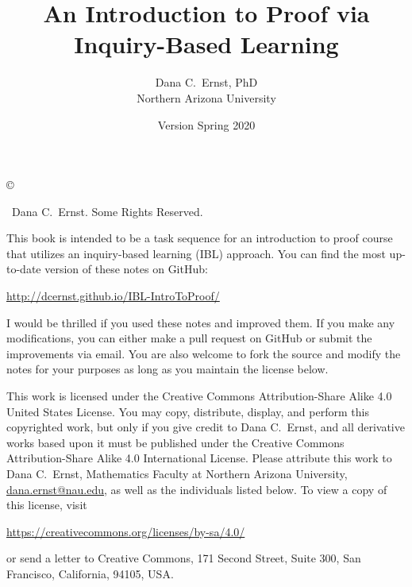 \documentclass[12pt,oneside]{book}
\theoremstyle{definition}
\begin{document}
\title{An Introduction to Proof via \\Inquiry-Based Learning}
\author{Dana C.~Ernst, PhD\\
Northern Arizona University}
\date{Version Spring 2020}

\maketitle
\thispagestyle{empty}

\noindent\copyright{ \the\year\ Dana C.~Ernst.  Some Rights Reserved.\\

\bigskip

\noindent This book is intended to be a task sequence for an introduction to proof course that utilizes an inquiry-based learning (IBL) approach.  You can find the most up-to-date version of these notes on GitHub:
\begin{center}
\url{http://dcernst.github.io/IBL-IntroToProof/}
\end{center}
I would be thrilled if you used these notes and improved them. If you make any modifications, you can either make a pull request on GitHub or submit the improvements via email.  You are also welcome to fork the source and modify the notes for your purposes as long as you maintain the license below.

\bigskip

\noindent This work is licensed under the Creative Commons Attribution-Share Alike 4.0 United States License.  You may copy, distribute, display, and perform this copyrighted work, but only if you give credit to Dana C.~Ernst, and all derivative works based upon it must be published under the Creative Commons Attribution-Share Alike 4.0 International License. Please attribute this work to Dana C.~Ernst, Mathematics Faculty at Northern Arizona University, \url{dana.ernst@nau.edu}, as well as the individuals listed below. To view a copy of this license, visit
\begin{center}
\url{https://creativecommons.org/licenses/by-sa/4.0/}
\end{center}
or send a letter to Creative Commons, 171 Second Street, Suite 300, San Francisco, California, 94105, USA.}

\medskip

\begin{center}
\ccbysa
\end{center}

\bigskip
\end{document}
